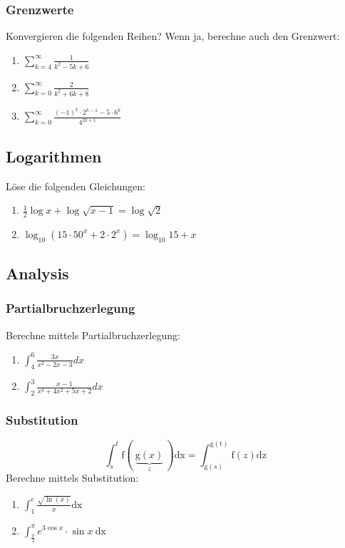 \documentclass[11pt, a4paper]{article}
\newcommand{\dx}{\ \mathrm{dx}}
\begin{document}
\subsubsection{Grenzwerte}
Konvergieren die folgenden Reihen? Wenn ja, berechne auch den Grenzwert:
\begin{enumerate}
	\item $\sum_{k=4}^\infty \frac{1}{k^2-5k+6}$
	\item $\sum_{k=0}^\infty \frac{2}{k^2+6k+8}$
	\item $\sum_{k=0}^\infty \frac{(-1)^k \cdot 2^{k-1} - 5 \cdot 6^k}{4^{2k+1}}$
\end{enumerate}

\subsection{Logarithmen}
Löse die folgenden Gleichungen:
\begin{enumerate}
	\item $\frac{1}{2} \log x + \log \sqrt{x-1} = \log \sqrt{2}$
	\item $\log_{10} \left( 15 \cdot 50^x + 2 \cdot 2^x \right) = \log_{10} 15 + x$
\end{enumerate}

\subsection{Analysis}
\subsubsection{Partialbruchzerlegung}
Berechne mittels Partialbruchzerlegung:
\begin{enumerate}
	\item $\int_4^6 \frac{3x}{x^2 - 2x - 3} dx$ %
	\item $\int_2^3 \frac{x-1}{x^3 + 4x^2 + 5x + 2} dx$ %
\end{enumerate}

\subsubsection{Substitution}
\[ \int_s^t \mathrm{f}( \ \underbrace{\mathrm{g}(x)}_z \ ) \mathrm{dx} = \int_{\mathrm{g}(s)}^{\mathrm{g(t)}} \mathrm{f}(z) \mathrm{dz} \]
Berechne mittels Substitution:
\begin{enumerate}
	\item $\int_1^e \frac{\sqrt{\ln(x)}}{x} \mathrm{dx}$
	\item $\int_\frac{\pi}{2}^\pi e^{3 \cos x} \cdot \sin x \dx$
\end{enumerate}
\end{document}
